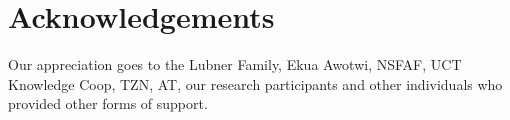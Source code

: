 \chapter*{Acknowledgements}

Our appreciation goes to the Lubner Family, Ekua Awotwi, NSFAF, UCT Knowledge Coop, TZN, AT, our research participants and other individuals who provided other forms of support.